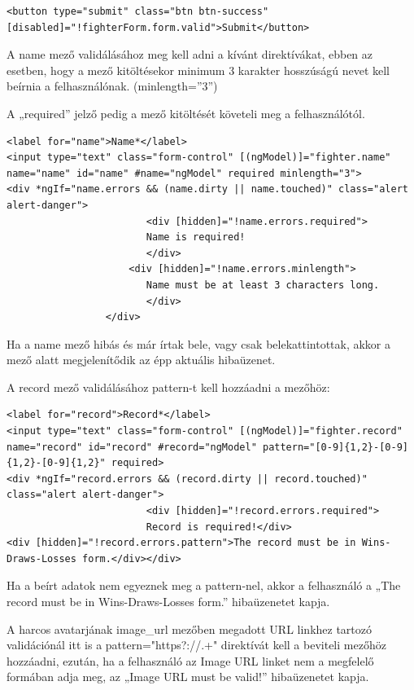 \begin{verbatim}
<button type="submit" class="btn btn-success" [disabled]="!fighterForm.form.valid">Submit</button>
\end{verbatim}

A name mező validálásához meg kell adni a kívánt direktívákat, ebben az esetben, hogy a mező kitöltésekor minimum 3 karakter hosszúságú nevet kell beírnia a felhasználónak. (minlength=”3”)

A „required” jelző pedig a mező kitöltését követeli meg a felhasználótól.

\begin{verbatim}
<label for="name">Name*</label>
<input type="text" class="form-control" [(ngModel)]="fighter.name" name="name" id="name" #name="ngModel" required minlength="3">
<div *ngIf="name.errors && (name.dirty || name.touched)" class="alert alert-danger">
            			<div [hidden]="!name.errors.required">
              			Name is required!
            			</div>
           			 <div [hidden]="!name.errors.minlength">
              			Name must be at least 3 characters long.
            			</div>
         		 </div>
\end{verbatim}

Ha a name mező hibás és már írtak bele, vagy csak belekattintottak, akkor a mező alatt megjelenítődik az épp aktuális hibaüzenet.

A record mező validálásához pattern-t kell hozzáadni a mezőhöz:

\begin{verbatim}
<label for="record">Record*</label>
<input type="text" class="form-control" [(ngModel)]="fighter.record" name="record" id="record" #record="ngModel" pattern="[0-9]{1,2}-[0-9]{1,2}-[0-9]{1,2}" required>
<div *ngIf="record.errors && (record.dirty || record.touched)" class="alert alert-danger">
            			<div [hidden]="!record.errors.required">
              			Record is required!</div>
<div [hidden]="!record.errors.pattern">The record must be in Wins-Draws-Losses form.</div></div>
\end{verbatim}

Ha a beírt adatok nem egyeznek meg a pattern-nel, akkor a felhasználó a „The record must be in Wins-Draws-Losses form.” hibaüzenetet kapja.

A harcos avatarjának image\_url mezőben megadott URL linkhez tartozó validációnál itt is a pattern="https?://.+" direktívát kell a beviteli mezőhöz hozzáadni, ezután, ha a felhasználó az Image URL linket nem a megfelelő formában adja meg, az „Image URL must be valid!” hibaüzenetet kapja.

